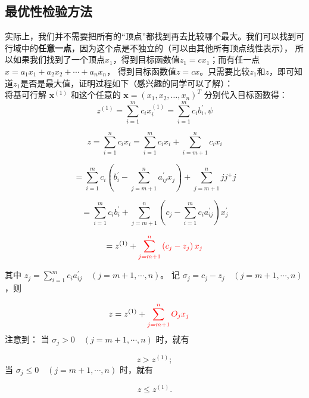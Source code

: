     \subsection{最优性检验方法}
    实际上，我们并不需要把所有的“顶点”都找到再去比较哪个最大。我们可以找到可行域中的\textbf{任意一点}，因为这个点是不独立的（可以由其他所有顶点线性表示），
    所以如果我们找到了一个顶点$x_1$，得到目标函数值$z_1=cx_1$；而有任一点$x=a_1x_1+a_2x_2+\cdots+a_nx_n$，
    得到目标函数值$z=cx$。只需要比较$z_1$和$z$，即可知道$z_1$是否是最大值，证明过程如下（感兴趣的同学可以了解）：\\
    将基可行解 \( \mathbf{x}^{(1)} \) 和这个任意的 \( \mathbf{x} = \left( x_1, x_2, \ldots, x_n \right)^T \) 分别代入目标函数得：
    \[
    z^{(1)} = \sum_{i=1}^{m} c_i x_i^{(1)} = \sum_{i=1}^{m} c_i b_i^{\prime}, \psi
    \]

    \[
    z = \sum_{i=1}^{n} c_i x_i = \sum_{i=1}^{m} c_i x_i + \sum_{i=m+1}^{n} c_i x_i
    \]

    \[
    = \sum_{i=1}^{m} c_i \left( b_i^{\prime} - \sum_{j=m+1}^{n} a_{ij}^{\prime} x_j \right) + \sum_{j=m+1}^{n} j j^+ j
    \]

    \[
    = \sum_{i=1}^{m} c_i b_i^{\prime} + \sum_{j=m+1}^{n} \left( c_j - \sum_{i=1}^{m} c_i a_{ij}^{\prime} \right) x_j^{\prime}
    \]

    \[
    = z^{(1)} + \textcolor{red}{\sum_{j=m+1}^{n} \left( c_j - z_j \right) x_j}
    \]

    其中 \( z_j = \sum_{i=1}^{m} c_i a_{ij}^{\prime} \quad (j = m+1, \cdots, n) \)。 记 \( \sigma_j = c_j - z_j \quad (j = m+1, \cdots, n) \)，则

    \[
    z = z^{(1)} + \textcolor{red}{\sum_{j=m+1}^{n} O_j x_j} \quad \
    \]
    注意到：
    当 \( \sigma_j > 0 \quad (j = m+1, \cdots, n) \) 时，就有

    \[
    z > z^{(1)} ;
    \]
    当 \( \sigma_j \leq 0 \quad (j = m+1, \cdots, n) \) 时，就有

    \[
    z \leq z^{(1)}.
    \]

